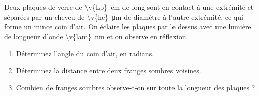 Deux plaques de verre de \qty{\v{Lp}}{cm} de long sont en contact à une extrémité et séparées par un cheveu de \qty{\v{hc}}{\micro\metre} de diamètre à l'autre extrémité, ce qui forme un mince coin d'air. On éclaire les plaques par le dessus avec une lumière de longueur d'onde \qty{\v{lam}}{nm} et on observe en réflexion.

\begin{center}
\end{center}

\begin{enumerate}[label=\alph*)]
    \item Déterminez l'angle du coin d'air, en radians.
    \item Déterminez la distance entre deux franges sombres voisines.
    \item Combien de franges sombres observe-t-on sur toute la longueur des plaques ?
\end{enumerate}
